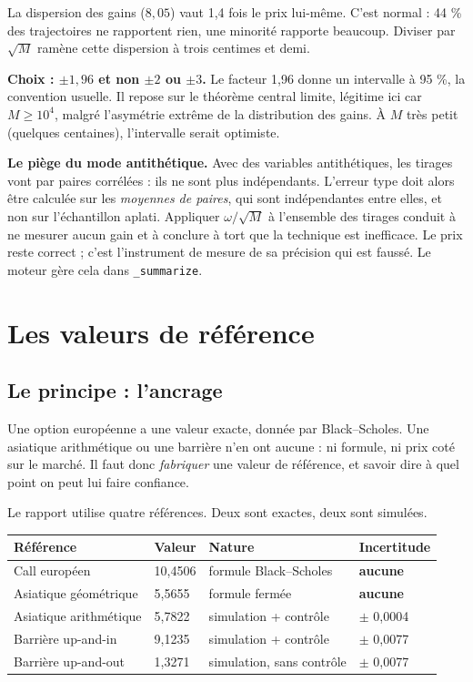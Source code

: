 \documentclass[11pt,a4paper]{article}
\begin{document}
La dispersion des gains ($8{,}05$) vaut 1,4 fois le prix lui-même. C'est
normal : 44 \% des trajectoires ne rapportent rien, une minorité rapporte
beaucoup. Diviser par $\sqrt{M}$ ramène cette dispersion à trois centimes et
demi.

\begin{choix}
\textbf{Choix : $\pm 1{,}96$ et non $\pm 2$ ou $\pm 3$.} Le facteur 1,96 donne
un intervalle à 95 \%, la convention usuelle. Il repose sur le théorème central
limite, légitime ici car $M \geq 10^4$, malgré l'asymétrie extrême de la
distribution des gains. À $M$ très petit (quelques centaines), l'intervalle
serait optimiste.
\end{choix}

\begin{encadre}
\textbf{Le piège du mode antithétique.} Avec des variables antithétiques, les
tirages vont par paires corrélées : ils ne sont plus indépendants. L'erreur
type doit alors être calculée sur les \emph{moyennes de paires}, qui sont
indépendantes entre elles, et non sur l'échantillon aplati. Appliquer
$\omega/\sqrt{M}$ à l'ensemble des tirages conduit à ne mesurer aucun gain et à
conclure à tort que la technique est inefficace. Le prix reste correct ; c'est
l'instrument de mesure de sa précision qui est faussé. Le moteur gère cela dans
\texttt{\_summarize}.
\end{encadre}

\section{Les valeurs de référence}

\subsection{Le principe : l'ancrage}

Une option européenne a une valeur exacte, donnée par Black--Scholes. Une
asiatique arithmétique ou une barrière n'en ont aucune : ni formule, ni prix
coté sur le marché. Il faut donc \emph{fabriquer} une valeur de référence, et
savoir dire à quel point on peut lui faire confiance.

Le rapport utilise quatre références. Deux sont exactes, deux sont simulées.

\begin{center}
\small
\begin{tabular}{llll}
\toprule
Référence & Valeur & Nature & Incertitude \\
\midrule
Call européen & 10,4506 & formule Black--Scholes & \textbf{aucune} \\
Asiatique géométrique & 5,5655 & formule fermée & \textbf{aucune} \\
Asiatique arithmétique & 5,7822 & simulation + contrôle & $\pm$ 0,0004 \\
Barrière up-and-in & 9,1235 & simulation + contrôle & $\pm$ 0,0077 \\
Barrière up-and-out & 1,3271 & simulation, sans contrôle & $\pm$ 0,0077 \\
\bottomrule
\end{tabular}
\end{center}
\end{document}
